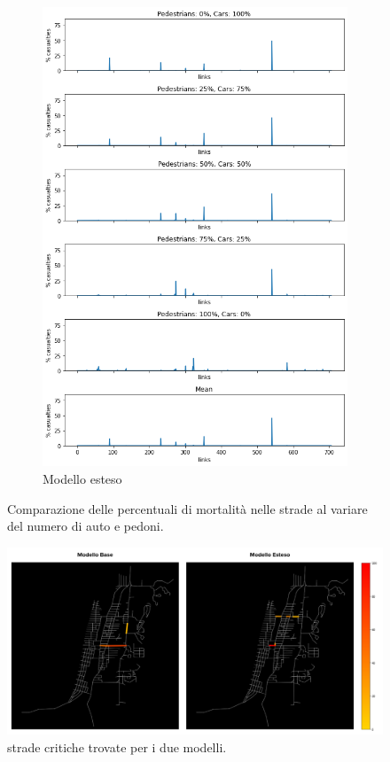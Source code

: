 \begin{figure}
\begin{subfigure}{0.475\textwidth}
        \includegraphics[width=\textwidth]{images/analisi/new_links_casualties}
        \caption{Modello esteso}
        \label{fig:new-link-casualties}
    \end{subfigure}
    \caption{Comparazione delle percentuali di mortalità nelle strade al variare del numero di auto e pedoni.}
    \label{fig:analisi-comparison-critical-links1}
\end{figure}

\begin{figure}
    \centering
    \includegraphics[width=\textwidth]{images/analisi/casualties-map.png}
    \caption{strade critiche trovate per i due modelli.}
    \label{fig:analisi-comparison-critical-links2}
\end{figure}


